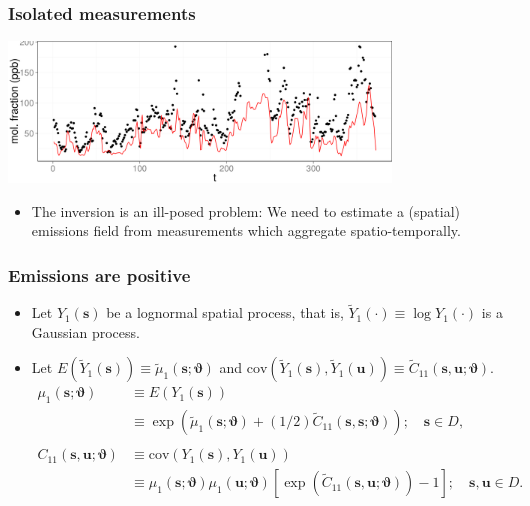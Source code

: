 \documentclass{beamer}
\newcommand{\svec} {\textbf{s}}
\newcommand{\uvec} {\textbf{u}}
\newcommand{\s}{\mathbf{s}}
\renewcommand{\u}{\mathbf{u}}
\newcommand{\E}{E}
\newcommand{\cov}{\mathrm{cov}}
\newcommand{\varthetab} {{\boldsymbol{\vartheta}}}
\begin{document}
\begin{frame}
\frametitle{Isolated measurements}

\begin{center}
\includegraphics[width=4in]{TAC_01.png}  
\end{center}

\vspace{-1cm}

\begin{itemize}
\small
\item The inversion is an ill-posed problem: We need to estimate a (spatial) emissions field from measurements which aggregate spatio-temporally.
\end{itemize}

\normalsize

\end{frame}

\begin{frame}
\frametitle{Emissions are positive}

\begin{itemize}

\item Let $Y_1(\svec)$ be a lognormal spatial process, that is, $\widetilde{Y}_1(\cdot) \equiv \log Y_1(\cdot)$ is a Gaussian process.
\item Let $\E(\widetilde{Y}_1(\s)) \equiv \widetilde\mu_1(\s;\varthetab)$ and $\cov(\widetilde{Y}_1(\s),\widetilde{Y}_1(\u)) \equiv \widetilde{C}_{11}(\s,\u; \varthetab)$.
\begin{align*}
\mu_1(\s;\varthetab) &\equiv \E(Y_1(\s)) \\ &\equiv  \exp(\widetilde{\mu}_1(\svec;\varthetab) + (1/2)\widetilde{C}_{11}(\s,\s;\varthetab)); \quad \svec \in D,\\
&\\
 C_{11}(\s,\u;\varthetab) &\equiv \cov(Y_1(\s),Y_1(\u)) 
\\&\equiv \mu_1(\s;\varthetab)\mu_1(\u;\varthetab)[\exp(\widetilde{C}_{11}(\s,\u;\varthetab)) - 1] ; \quad \svec,\uvec \in D.
\end{align*}
\end{itemize}

\end{frame}
\end{document}
